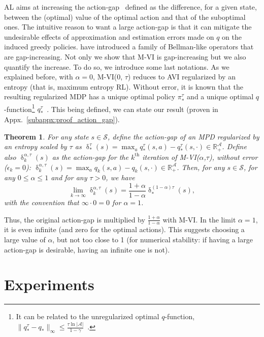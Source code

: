 \documentclass{article}
\newtheorem{theorem}{Theorem}
\DeclareMathOperator{\gapop}{\delta}
\newcommand{\states}{\mathcal{S}}
\newcommand{\actions}{\mathcal{A}}
\newcommand{\gap}{\gapop}
\begin{document}
AL aims at increasing the action-gap~\cite{farahmand2011action} defined as the difference, for a given state, between the (optimal) value of the optimal action and that of the suboptimal ones. The intuitive reason to want a large action-gap is that it can mitigate the undesirable effects of approximation and estimation errors made on $q$ on the induced greedy policies. \citet{bellemare2016increasing} have introduced a family of Bellman-like operators that are gap-increasing. Not only we show that M-VI is gap-increasing but we also quantify the increase. To do so, we introduce some last notations. As we explained before, with $\alpha=0$, M-VI(0, $\tau$) reduces to AVI regularized by an entropy (that is, maximum entropy RL). Without error, it is known that the resulting regularized MDP has a unique optimal policy $\pi_*^{\tau}$ and a unique optimal $q$-function\footnote{It can be related to the unregularized optimal $q$-function, $\|q_*^{\tau} - q_*\|_\infty \leq \frac{\tau\ln|\actions|}{1-\gamma}$~\cite{geist2019theory}.} $q_*^\tau$~\cite{geist2019theory}. This being defined, we can state our result (proven in Appx.~\ref{subappx:proof_action_gap}).
\begin{theorem}
\label{thm:action_gap}
    For any state $s\in\states$, define the action-gap of an MPD regularized by an entropy scaled by $\tau$ as $\gap_*^\tau(s) = \max_{a} q_*^\tau(s,a) - q_*^\tau(s,\cdot)\in\mathbb{R}_+^\actions$. Define also $\gap^{\alpha,\tau}_k(s)$ as the action-gap for the $k^\text{th}$ iteration of M-VI($\alpha$,$\tau$), without error ($\epsilon_k=0$): $\gap^{\alpha,\tau}_k(s) = \max_a q_k(s,a) - q_k(s,\cdot)\in\mathbb{R}_+^\actions$. Then, for any $s\in\states$, for any $0\leq\alpha\leq 1$ and for any $\tau>0$, we have
    \begin{equation}
        \lim_{k\rightarrow\infty} \gap^{\alpha,\tau}_k(s) = \frac{1+\alpha}{1-\alpha} \gap_*^{(1-\alpha)\tau}(s),
    \end{equation}
with the convention that $\infty\cdot 0 = 0$ for $\alpha=1$.
\end{theorem}
Thus, the original action-gap is multiplied by $\frac{1+\alpha}{1-\alpha}$ with M-VI. In the limit $\alpha=1$, it is even infinite (and zero for the optimal actions). This suggests choosing a large value of $\alpha$, but not too close to 1 (for numerical stability: if having a large action-gap is desirable, having an infinite one is not).






\section{Experiments \label{sec:experiments}}
\end{document}
